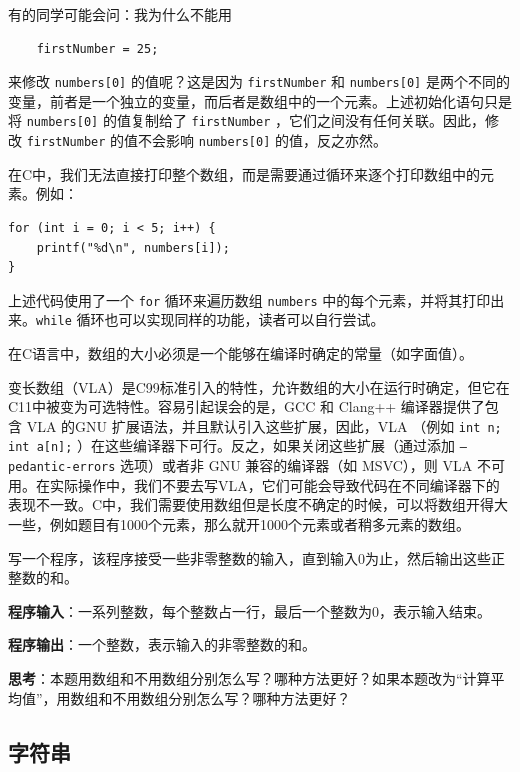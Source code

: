 有的同学可能会问：我为什么不能用
\begin{verbatim}
    firstNumber = 25;
\end{verbatim}
来修改 \texttt{numbers[0]} 的值呢？这是因为 \texttt{firstNumber} 和 \texttt{numbers[0]} 是两个不同的变量，前者是一个独立的变量，而后者是数组中的一个元素。上述初始化语句只是将 \texttt{numbers[0]} 的值复制给了 \texttt{firstNumber} ，它们之间没有任何关联。因此，修改 \texttt{firstNumber} 的值不会影响 \texttt{numbers[0]} 的值，反之亦然。

在C中，我们无法直接打印整个数组，而是需要通过循环来逐个打印数组中的元素。例如：
\begin{verbatim}
for (int i = 0; i < 5; i++) {
    printf("%d\n", numbers[i]);
}
\end{verbatim}

上述代码使用了一个 \texttt{for} 循环来遍历数组 \texttt{numbers} 中的每个元素，并将其打印出来。\texttt{while} 循环也可以实现同样的功能，读者可以自行尝试。

在C语言中，数组的大小必须是一个能够在编译时确定的常量（如字面值）。

\begin{caution}
  变长数组（VLA）是C99标准引入的特性，允许数组的大小在运行时确定，但它在C11中被变为可选特性。容易引起误会的是，GCC 和 Clang++ 编译器提供了包含 VLA 的GNU 扩展语法，并且默认引入这些扩展，因此，VLA （例如 \texttt{int n; int a[n];} ）在这些编译器下可行。反之，如果关闭这些扩展（通过添加  \texttt{--pedantic-errors}  选项）或者非 GNU 兼容的编译器（如 MSVC），则 VLA 不可用。在实际操作中，我们不要去写VLA，它们可能会导致代码在不同编译器下的表现不一致。C中，我们需要使用数组但是长度不确定的时候，可以将数组开得大一些，例如题目有1000个元素，那么就开1000个元素或者稍多元素的数组。
\end{caution}

\begin{exercise}[计算求和]
写一个程序，该程序接受一些非零整数的输入，直到输入0为止，然后输出这些正整数的和。

\textbf{程序输入}：一系列整数，每个整数占一行，最后一个整数为0，表示输入结束。

\textbf{程序输出}：一个整数，表示输入的非零整数的和。

\textbf{思考}：本题用数组和不用数组分别怎么写？哪种方法更好？如果本题改为“计算平均值”，用数组和不用数组分别怎么写？哪种方法更好？
    
\end{exercise}

\subsection{字符串}

